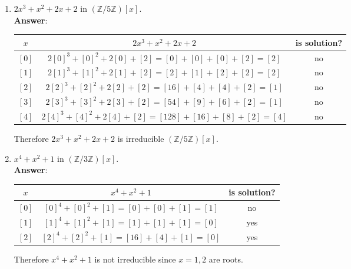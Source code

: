 \documentclass{article}
\begin{document}
\begin{enumerate}
\begin{enumerate}
                  \item $2x^3+x^2+2x+2$ in $(\mathbb{Z}/5\mathbb{Z})[x]$.\\
                        \textbf{Answer}:
                        \begin{center}
                              \begin{tabular}{c|c|c}
                                    $x$   & $2x^3+x^2+2x+2$                                & is solution? \\
                                    \hline
                                    $[0]$ & $2[0]^3+[0]^2+2[0]+[2]=[0]+[0]+[0]+[2]=[2]$    & no           \\
                                    $[1]$ & $2[1]^3+[1]^2+2[1]+[2]=[2]+[1]+[2]+[2]=[2]$    & no           \\
                                    $[2]$ & $2[2]^3+[2]^2+2[2]+[2]=[16]+[4]+[4]+[2]=[1]$   & no           \\
                                    $[3]$ & $2[3]^3+[3]^2+2[3]+[2]=[54]+[9]+[6]+[2]=[1]$   & no           \\
                                    $[4]$ & $2[4]^3+[4]^2+2[4]+[2]=[128]+[16]+[8]+[2]=[4]$ & no
                              \end{tabular}
                        \end{center}
                        Therefore $2x^3+x^2+2x+2$ is irreducible $(\mathbb{Z}/5\mathbb{Z})[x]$.
                  \item $x^4+x^2+1$ in $(\mathbb{Z}/3\mathbb{Z})[x]$.\\
                        \textbf{Answer}:
                        \begin{center}
                              \begin{tabular}{c|c|c}
                                    $x$   & $x^4+x^2+1$                        & is solution? \\
                                    \hline
                                    $[0]$ & $[0]^4+[0]^2+[1]=[0]+[0]+[1]=[1]$  & no           \\
                                    $[1]$ & $[1]^4+[1]^2+[1]=[1]+[1]+[1]=[0]$  & yes           \\
                                    $[2]$ & $[2]^4+[2]^2+[1]=[16]+[4]+[1]=[0]$ & yes
                              \end{tabular}
                        \end{center}
                        Therefore $x^4+x^2+1$ is not irreducible since $x=1,2$ are roots.

\end{enumerate}
\end{enumerate}
\end{document}
